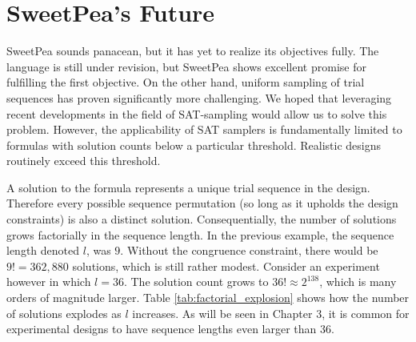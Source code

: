 \section{SweetPea's Future}

SweetPea sounds panacean, but it has yet to realize its objectives fully. The language is still under revision, but SweetPea shows excellent promise for fulfilling the first objective. On the other hand, uniform sampling of trial sequences has proven significantly more challenging. We hoped that leveraging recent developments in the field of SAT-sampling would allow us to solve this problem. However, the applicability of SAT samplers is fundamentally limited to formulas with solution counts below a particular threshold. Realistic designs routinely exceed this threshold.

A solution to the formula represents a unique trial sequence in the design. Therefore every possible sequence permutation (so long as it upholds the design constraints) is also a distinct solution. Consequentially, the number of solutions grows factorially in the sequence length. In the previous example, the sequence length denoted $l$, was $9$. Without the congruence constraint, there would be $9! = 362,880$ solutions, which is still rather modest. Consider an experiment however in which $l = 36$. The solution count grows to $36! \approx 2^{138}$, which is many orders of magnitude larger. Table \ref{tab:factorial_explosion} shows how the number of solutions explodes as $l$ increases. As will be seen in Chapter 3, it is common for experimental designs to have sequence lengths even larger than 36.

